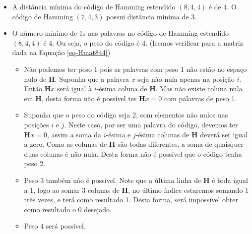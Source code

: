 \begin{frame}[allowframebreaks]
\begin{itemize}
       ou, de forma equivalente,

        \begin{equation}
        H = 
        \left(
        \begin{array}{ccccccc;{2pt/2pt}c}
        0 & 1 & 1 & 1 & 1 & 0 & 0 & 0 \\
        1 & 0 & 1 & 1 & 0 & 1 & 0 & 0 \\
        1 & 1 & 0 & 1 & 0 & 0 & 1 & 0 \\ \hdashline[2pt/2pt]
        1 & 1 & 1 & 0 & 0 & 0 & 0 & 1
        \end{array}
        \right).
        \end{equation}


     \item A distância mínima do código de Hamming estendido $(8,4,4)$ é de 4. 
	O código de Hamming $(7,4,3)$ possui distância mínima de 3.

    \item O número mínimo de 1s nas palavras no código de Hamming estendido $(8,4,4)$ é 4. 
	Ou seja, o peso do código é 4. (Iremos verificar para a matriz dada na Equação \ref{eq-Hmat844})
        \begin{itemize}
	\item Não podemos ter peso 1 pois as palavras com peso 1 não estão no espaço nulo de 
	$\mathbf{H}$. Suponha que a palavra $x$ seja não nula apenas na posição $i$. Então
	$\mathbf{H} x$ será igual à $i$-ésima coluna de $\mathbf{H}$. Mas não existe coluna 
	nula em $\mathbf{H}$, desta forma não é possível ter $\mathbf{H} x = 0$ com palavras
	de peso 1.
        \item Suponha que o peso do código seja 2, com elementos não nulos nas posições $i$ e $j$.
        Neste caso, por ser uma palavra do código, devemos ter $\mathbf{H} x = 0$, assim a soma
        da $i$-ésima e $j$-ésima colunas de $\mathbf{H}$ deverá ser igual a zero. 
	Como as colunas de $\mathbf{H}$ são todas diferentes, a soma de quaisquer duas colunas é 
	não nula. Desta forma não é possível que o código tenha peso 2.
        \item Peso 3 também não é possível. Note que a última linha de $\mathbf{H}$ é toda igual a 1,
	logo ao somar 3 colunas de $\mathbf{H}$, no último índice estaremos somando 1 três vezes, e
	terá como resultado 1. Desta forma, será impossível obter como resultado o $0$ desejado.
	\item Peso 4 será possível.
        \end{itemize}



\end{itemize}
\end{frame}

